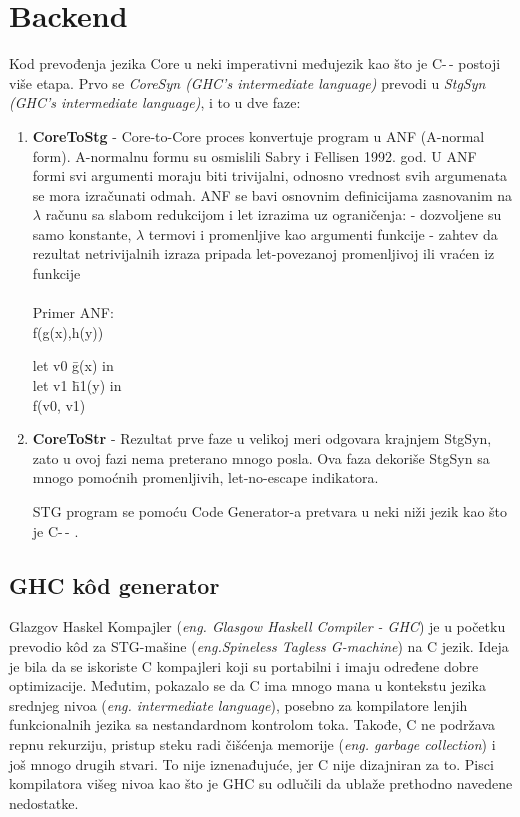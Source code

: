 \section{Backend}
\label{sec:backend}

Kod prevođenja jezika Core u neki imperativni međujezik kao što je C-\,- postoji više etapa.
Prvo se \textit{CoreSyn (GHC’s intermediate language)} prevodi u \textit{StgSyn (GHC’s intermediate language)}, i to u dve faze:
\begin{enumerate}
	\item \textbf{CoreToStg} - Core-to-Core proces konvertuje program u ANF (A-normal form). A-normalnu formu su osmislili Sabry i Fellisen 1992. god.  U ANF formi svi argumenti moraju biti trivijalni, odnosno vrednost svih argumenata se mora izračunati odmah. ANF se bavi osnovnim definicijama zasnovanim na $\lambda$ računu sa slabom redukcijom i let izrazima uz ograničenja:
	- dozvoljene su samo konstante, $\lambda$ termovi i promenljive kao argumenti funkcije
	- zahtev da rezultat netrivijalnih izraza pripada let-povezanoj promenljivoj ili vraćen iz funkcije \\ \\
	Primer ANF: \\ f(g(x),h(y))\\
	
	\begin{tabbing}
		let v0 \= g(x) in \\
		\>let v1 \= h1(y) in \\
		\> \> f(v0, v1)
	\end{tabbing}

	\item \textbf{CoreToStr} - Rezultat prve faze u velikoj meri odgovara krajnjem StgSyn, zato u ovoj fazi nema preterano mnogo posla. Ova faza dekoriše StgSyn sa mnogo pomoćnih  promenljivih, let-no-escape indikatora.
	
	STG program se pomoću  Code Generator-a pretvara u neki niži jezik kao što je C-\,- \cite{C--05}.
	
\end{enumerate}

\subsection{GHC k\^{o}d generator}
\label{sec:podnaslovGHCGenerator}

Glazgov Haskel Kompajler (\emph {eng. Glasgow Haskell Compiler - GHC}) je u početku prevodio k\^{o}d za STG-mašine (\emph{eng.Spineless Tagless G-machine}) na C jezik. Ideja je bila da se iskoriste C kompajleri koji su portabilni i imaju određene dobre optimizacije. Međutim, pokazalo se da C ima mnogo mana u kontekstu jezika srednjeg nivoa (\emph {eng. intermediate language}), posebno za kompilatore lenjih funkcionalnih jezika sa nestandardnom kontrolom toka. Takođe, C ne podržava repnu rekurziju, pristup steku radi čišćenja memorije (\emph{eng. garbage collection}) i još mnogo drugih stvari. To nije iznenađujuće, jer C nije dizajniran za to. Pisci kompilatora višeg nivoa kao što je GHC su odlučili da ublaže prethodno navedene nedostatke.

